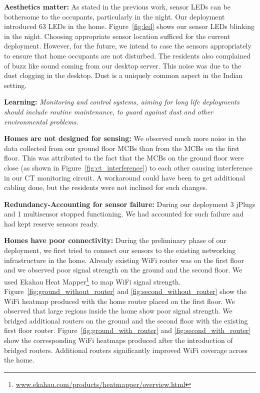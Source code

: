 \documentclass[10pt]{sensys-proc}
\newcommand{\figref}[1]{Figure~\ref{#1}}
\begin{document}
\noindent \textbf{Aesthetics matter:} As stated in the previous work, sensor LEDs can be bothersome to the occupants, particularly in the night. Our deployment introduced 63 LEDs in the home. \figref{fig:led} shows our sensor LEDs blinking in the night. Choosing appropriate sensor location sufficed for the current deployment. However, for the future, we intend to case the sensors appropriately to ensure that home occupants are not disturbed. The residents also complained of buzz like sound coming from our desktop server. This noise was due to the dust clogging in the desktop. Dust is a uniquely common aspect in the Indian setting. 

\textbf{Learning:} \emph{Monitoring and control systems, aiming for long life deployments should include routine maintenance, to guard against dust and other environmental problems.}

\noindent \textbf{Homes are not designed for sensing:} We observed much more noise in the data collected from our ground floor MCBs than from the MCBs on the first floor. This was attributed to the fact that the MCBs on the ground floor were close (as shown in \figref{fig:ct_interference}) to each other causing interference in our CT monitoring circuit. A workaround could have been to get additional cabling done, but the residents were not inclined for such changes. %

\noindent \textbf{Redundancy-Accounting for sensor failure:} During our deployment 3 jPlugs and 1 multisensor stopped functioning. We had accounted for such failure and had kept reserve sensors ready. %

\noindent \textbf{Homes have poor connectivity:} During the preliminary phase of our deployment, we first tried to connect our sensors to the existing networking infrastructure in the home. Already existing WiFi router was on the first floor and we observed poor signal strength on the ground and the second floor. We used Ekahau Heat Mapper\footnote{\url{www.ekahau.com/products/heatmapper/overview.html}} to map WiFi signal strength. \figref{fig:ground_without_router} and \ref{fig:second_without_router} show the WiFi heatmap produced with the home router placed on the first floor. We observed that large regions inside the home show poor signal strength. We bridged additional routers on the ground and the second floor with the existing first floor router. \figref{fig:ground_with_router} and \ref{fig:second_with_router} show the corresponding WiFi heatmaps produced after the introduction of bridged routers. Additional routers significantly improved WiFi coverage across the home. 
\end{document}
